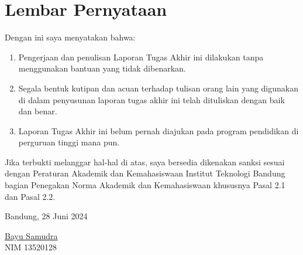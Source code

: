\chapter*{Lembar Pernyataan}

Dengan ini saya menyatakan bahwa:
\begin{enumerate}
  \item Pengerjaan dan penulisan Laporan Tugas Akhir ini dilakukan tanpa menggunakan bantuan yang tidak dibenarkan.
  \item Segala bentuk kutipan dan acuan terhadap tulisan orang lain yang digunakan di dalam penyusunan laporan tugas akhir ini telah dituliskan dengan baik dan benar.
  \item Laporan Tugas Akhir ini belum pernah diajukan pada program pendidikan di perguruan tinggi mana pun.
\end{enumerate}

Jika terbukti melanggar hal-hal di atas, saya bersedia dikenakan sanksi sesuai dengan Peraturan Akademik dan Kemahasiswaan Institut Teknologi Bandung bagian Penegakan Norma Akademik dan Kemahasiswaan khususnya Pasal 2.1 dan Pasal 2.2. 

Bandung, 28 Juni 2024

\vspace{1.75cm}

\underline{Bayu Samudra}\\
NIM 13520128
